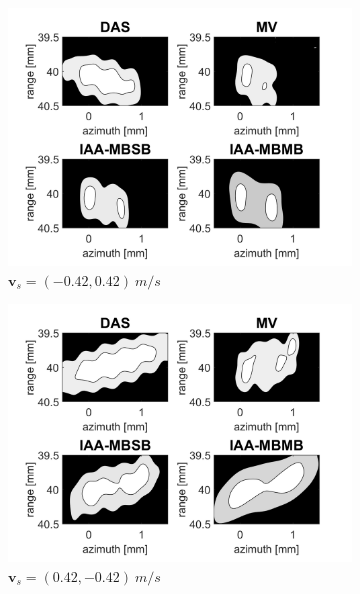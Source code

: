 \begin{figure}[ht]
    \quad
    \begin{subfigure}[t]{0.48\linewidth}
        \includegraphics[width=\linewidth]{./images/results/4/motion_-45_-06.png}
        \caption{$\boldsymbol{v}_s = (-0.42, 0.42)~m/s$}
        \label{fig:mla_e}
    \end{subfigure}
    \quad
    \begin{subfigure}[t]{0.48\linewidth}
        \includegraphics[width=\linewidth]{./images/results/4/motion_-45_06.png}
        \caption{$\boldsymbol{v}_s = (0.42, -0.42)~m/s$}
        \label{fig:mla_f}
    \end{subfigure}
    \quad
    \begin{subfigure}[t]{0.48\linewidth}

\end{subfigure}
\end{figure}
